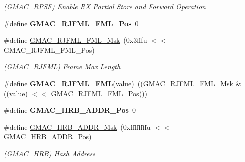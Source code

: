 \begin{DoxyCompactItemize}
\begin{DoxyCompactList}\small\item\em (G\+M\+A\+C\+\_\+\+R\+P\+SF) Enable RX Partial Store and Forward Operation \end{DoxyCompactList}\item 
\mbox{\label{group__SAME70__GMAC_ga7ba9989d3f68bae689da8b680fe8ed6f}} 
\#define {\bfseries G\+M\+A\+C\+\_\+\+R\+J\+F\+M\+L\+\_\+\+F\+M\+L\+\_\+\+Pos}~0
\item 
\mbox{\label{group__SAME70__GMAC_ga049bdd4d6c1ce5dd9b27539c1ba39c23}} 
\#define \mbox{\hyperlink{group__SAME70__GMAC_ga049bdd4d6c1ce5dd9b27539c1ba39c23}{G\+M\+A\+C\+\_\+\+R\+J\+F\+M\+L\+\_\+\+F\+M\+L\+\_\+\+Msk}}~(0x3fffu $<$$<$ G\+M\+A\+C\+\_\+\+R\+J\+F\+M\+L\+\_\+\+F\+M\+L\+\_\+\+Pos)
\begin{DoxyCompactList}\small\item\em (G\+M\+A\+C\+\_\+\+R\+J\+F\+ML) Frame Max Length \end{DoxyCompactList}\item 
\mbox{\label{group__SAME70__GMAC_ga473e9dbee634d96458ff55119a3753eb}} 
\#define {\bfseries G\+M\+A\+C\+\_\+\+R\+J\+F\+M\+L\+\_\+\+F\+ML}(value)~((\mbox{\hyperlink{group__SAMV71__GMAC_ga049bdd4d6c1ce5dd9b27539c1ba39c23}{G\+M\+A\+C\+\_\+\+R\+J\+F\+M\+L\+\_\+\+F\+M\+L\+\_\+\+Msk}} \& ((value) $<$$<$ G\+M\+A\+C\+\_\+\+R\+J\+F\+M\+L\+\_\+\+F\+M\+L\+\_\+\+Pos)))
\item 
\mbox{\label{group__SAME70__GMAC_ga9363b4e2c07082833a0a041f4159596d}} 
\#define {\bfseries G\+M\+A\+C\+\_\+\+H\+R\+B\+\_\+\+A\+D\+D\+R\+\_\+\+Pos}~0
\item 
\mbox{\label{group__SAME70__GMAC_gab52c79a040ec7a18cb28a18163cf33d9}} 
\#define \mbox{\hyperlink{group__SAME70__GMAC_gab52c79a040ec7a18cb28a18163cf33d9}{G\+M\+A\+C\+\_\+\+H\+R\+B\+\_\+\+A\+D\+D\+R\+\_\+\+Msk}}~(0xffffffffu $<$$<$ G\+M\+A\+C\+\_\+\+H\+R\+B\+\_\+\+A\+D\+D\+R\+\_\+\+Pos)
\begin{DoxyCompactList}\small\item\em (G\+M\+A\+C\+\_\+\+H\+RB) Hash Address \end{DoxyCompactList}\item 
\mbox{\label{group__SAME70__GMAC_ga61abf140f19d064bd8ffd48aaa12d744}} 
$$
\end{DoxyCompactItemize}
